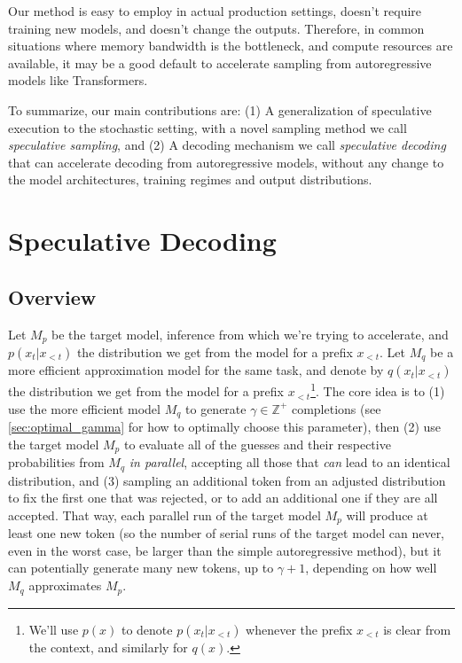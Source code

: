 Our method is easy to employ in actual production settings, doesn't require training new models, and doesn't change the outputs. Therefore, in common situations where memory bandwidth is the bottleneck, and  compute resources are available, it may be a good default to accelerate sampling from autoregressive models like Transformers.

To summarize, our main contributions are: (1) A generalization of speculative execution to the stochastic setting, with a novel sampling method we call \emph{speculative sampling}, and (2) A decoding mechanism we call \emph{speculative decoding} that can accelerate decoding from autoregressive models, without any change to the model architectures, training regimes and output distributions.

\section{Speculative Decoding}
\subsection{Overview}

Let $M_p$ be the target model, inference from which we're trying to accelerate, and $p(x_t|x_{<t})$ the distribution we get from the model for a prefix $x_{<t}$. Let $M_q$ be a more efficient approximation model for the same task, and denote by $q(x_t|x_{<t})$ the distribution we get from the model for a prefix $x_{<t}$\footnote{
We'll use $p(x)$ to denote $p(x_t|x_{<t})$ whenever the prefix $x_{<t}$ is clear from the context, and similarly for $q(x)$.}. The core idea is to (1) use the more efficient model $M_q$ to generate $\gamma \in \mathbb{Z}^+$ completions (see \ref{sec:optimal_gamma} for how to optimally choose this parameter), then (2) use the target model $M_p$ to evaluate all of the guesses and their respective probabilities from $M_q$ \emph{in parallel}, accepting all those that \emph{can} lead to an identical distribution, and (3) sampling an additional token from an adjusted distribution to fix the first one that was rejected, or to add an additional one if they are all accepted. That way, each parallel run of the target model $M_p$ will produce at least one new token (so the number of serial runs of the target model can never, even in the worst case, be larger than the simple autoregressive method), but it can potentially generate many new tokens, up to $\gamma + 1$, depending on how well $M_q$ approximates $M_p$.

